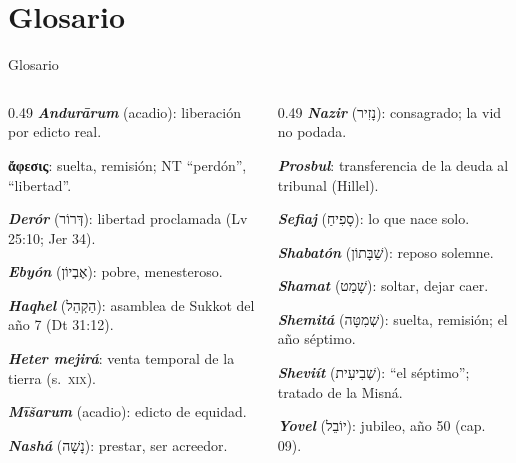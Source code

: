 \documentclass[hyperref={bookmarks=false},aspectratio=169]{beamer}
\newcommand{\heb}[1]{\mbox{\foreignlanguage{hebrew}{#1}}}
\newcommand{\grc}[1]{\foreignlanguage{ancientgreek}{#1}}
\begin{document}
\section{Glosario}

\begin{frame}{Glosario}
\fontsize{6.6}{7.8}\selectfont
\begin{columns}[t,onlytextwidth]
\begin{column}{0.49\textwidth}
\textbf{\emph{Andurārum}} (acadio): liberación por edicto real.\par
\textbf{\grc{ἄφεσις}}: suelta, remisión; NT ``perdón'', ``libertad''.\par
\textbf{\emph{Derór}} (\heb{דְּרוֹר}): libertad proclamada (Lv 25:10; Jer 34).\par
\textbf{\emph{Ebyón}} (\heb{אֶבְיוֹן}): pobre, menesteroso.\par
\textbf{\emph{Haqhel}} (\heb{הַקְהֵל}): asamblea de Sukkot del año 7 (Dt 31:12).\par
\textbf{\emph{Heter mejirá}}: venta temporal de la tierra (s.~\textsc{xix}).\par
\textbf{\emph{Mīšarum}} (acadio): edicto de equidad.\par
\textbf{\emph{Nashá}} (\heb{נָשָׁה}): prestar, ser acreedor.
\end{column}
\begin{column}{0.49\textwidth}
\textbf{\emph{Nazir}} (\heb{נָזִיר}): consagrado; la vid no podada.\par
\textbf{\emph{Prosbul}}: transferencia de la deuda al tribunal (Hillel).\par
\textbf{\emph{Sefiaj}} (\heb{סָפִיחַ}): lo que nace solo.\par
\textbf{\emph{Shabatón}} (\heb{שַׁבָּתוֹן}): reposo solemne.\par
\textbf{\emph{Shamat}} (\heb{שָׁמַט}): soltar, dejar caer.\par
\textbf{\emph{Shemitá}} (\heb{שְׁמִטָּה}): suelta, remisión; el año séptimo.\par
\textbf{\emph{Sheviít}} (\heb{שְׁבִיעִית}): ``el séptimo''; tratado de la Misná.\par
\textbf{\emph{Yovel}} (\heb{יוֹבֵל}): jubileo, año 50 (cap. 09).
\end{column}
\end{columns}
\end{frame}

\end{document}
